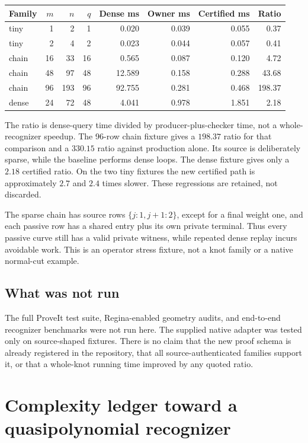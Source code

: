 \documentclass[11pt,letterpaper]{article}
\theoremstyle{definition}
\begin{document}
\begin{center}
\small
\begin{tabular}{lrrrrrrr}
\toprule
Family & $m$ & $n$ & $q$ & Dense ms & Owner ms & Certified ms & Ratio\\
\midrule
tiny & 1 & 2 & 1 & 0.020 & 0.039 & 0.055 & 0.37\\
tiny & 2 & 4 & 2 & 0.023 & 0.044 & 0.057 & 0.41\\
chain & 16 & 33 & 16 & 0.565 & 0.087 & 0.120 & 4.72\\
chain & 48 & 97 & 48 & 12.589 & 0.158 & 0.288 & 43.68\\
chain & 96 & 193 & 96 & 92.755 & 0.281 & 0.468 & 198.37\\
dense & 24 & 72 & 48 & 4.041 & 0.978 & 1.851 & 2.18\\
\bottomrule
\end{tabular}
\end{center}
The ratio is dense-query time divided by producer-plus-checker time, not a whole-recognizer speedup. The 96-row chain fixture gives a $198.37$ ratio for that comparison and a $330.15$ ratio against production alone. Its source is deliberately sparse, while the baseline performs dense loops. The dense fixture gives only a $2.18$ certified ratio. On the two tiny fixtures the new certified path is approximately $2.7$ and $2.4$ times slower. These regressions are retained, not discarded.

The sparse chain has source rows $\{j:1,j+1:2\}$, except for a final weight one, and each passive row has a shared entry plus its own private terminal. Thus every passive curve still has a valid private witness, while repeated dense replay incurs avoidable work. This is an operator stress fixture, not a knot family or a native normal-cut example.

\subsection{What was not run}
The full ProveIt test suite, Regina-enabled geometry audits, and end-to-end recognizer benchmarks were not run here. The supplied native adapter was tested only on source-shaped fixtures. There is no claim that the new proof schema is already registered in the repository, that all source-authenticated families support it, or that a whole-knot running time improved by any quoted ratio.

\section{Complexity ledger toward a quasipolynomial recognizer}
\end{document}
